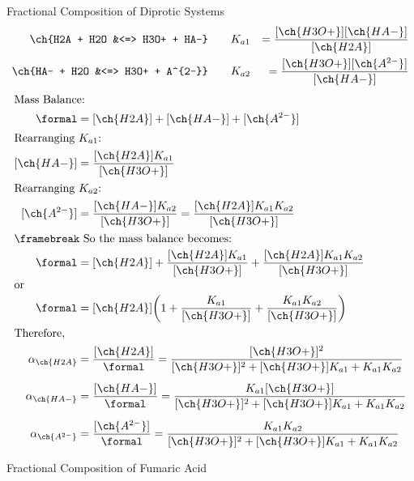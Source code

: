 \documentclass[notes=show]{beamer}
\begin{document}
\begin{frame}[allowframebreaks]{Fractional Composition of Diprotic Systems}
	\begin{align*}
		\ch{H2A + H2O &<=> H3O+ + HA-} \qquad &K_{a1} &=
		\frac{[\ch{H3O+}][\ch{HA-}]}{[\ch{H2A}]} \\
		\ch{HA- + H2O &<=> H3O+ + A^{2-}} \qquad &K_{a2} &=
		\frac{[\ch{H3O+}][\ch{A^{2-}}]}{[\ch{HA-}]}
	\end{align*}
	\begin{align*}
		\shortintertext{Mass Balance:}
		\si{\formal} &= [\ch{H2A}] + [\ch{HA-}] + [\ch{A^{2-}}] \\
		\shortintertext{Rearranging $K_{a1}$:}
		[\ch{HA-}] &= \frac{[\ch{H2A}]K_{a1}}{[\ch{H3O+}]} \\
		\shortintertext{Rearranging $K_{a2}$:}
		[\ch{A^{2-}}] &= \frac{[\ch{HA-}]K_{a2}}{[\ch{H3O+}]} =
		\frac{[\ch{H2A}]K_{a1}K_{a2}}{[\ch{H3O+}]} \\
		\shortintertext{\framebreak So the mass balance becomes:}
		\si{\formal} &= [\ch{H2A}] +
		\frac{[\ch{H2A}]K_{a1}}{[\ch{H3O+}]} +
		\frac{[\ch{H2A}]K_{a1}K_{a2}}{[\ch{H3O+}]} \\
		\shortintertext{or}
		\si{\formal} &= [\ch{H2A}]\bigg(1 + \frac{K_{a1}}{[\ch{H3O+}]}
		+ \frac{K_{a1}K_{a2}}{[\ch{H3O+}]}\bigg) \\
		\shortintertext{Therefore,}
		\alpha_{\ch{H2A}} &= \frac{[\ch{H2A}]}{\si{\formal}} =
		\frac{[\ch{H3O+}]^2}{[\ch{H3O+}]^2 + [\ch{H3O+}]K_{a1} +
		K_{a1}K_{a2}} \\[0.5em]
		\alpha_{\ch{HA-}} &= \frac{[\ch{HA-}]}{\si{\formal}} =
		\frac{K_{a1}[\ch{H3O+}]}{[\ch{H3O+}]^2 + [\ch{H3O+}]K_{a1} +
		K_{a1}K_{a2}} \\[0.5em]
		\alpha_{\ch{A^{2-}}} &= \frac{[\ch{A^{2-}}]}{\si{\formal}} =
		\frac{K_{a1}K_{a2}}{[\ch{H3O+}]^2 + [\ch{H3O+}]K_{a1} +
		K_{a1}K_{a2}}
	\end{align*}
\end{frame}

\begin{frame}{Fractional Composition of Fumaric Acid}
	\begin{center}
		
	\end{center}
\end{frame}
\end{document}
